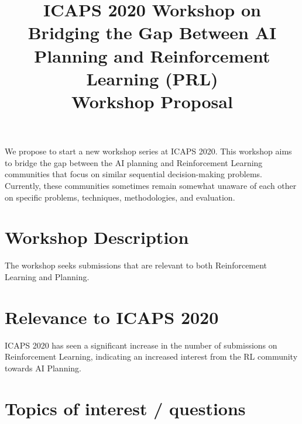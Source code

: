 \documentclass[10pt]{article}
\begin{document}
\title{ICAPS 2020 Workshop on \\ Bridging the Gap Between AI Planning and Reinforcement Learning (PRL)\\ \vspace*{0.7cm} Workshop Proposal
}
\date{}

\author{}

\maketitle


We propose to start a new workshop series at ICAPS 2020. This workshop aims to
bridge the gap between the AI planning and Reinforcement Learning communities
that focus on similar sequential decision-making problems. Currently, these
communities sometimes remain somewhat unaware of each other on specific
problems, techniques, methodologies, and evaluation.

\section*{Workshop Description}

The workshop seeks submissions that are relevant to both Reinforcement Learning
and Planning. 



\section*{Relevance to ICAPS 2020}
ICAPS 2020 has seen a significant increase in the number of submissions on
Reinforcement Learning, indicating an increased interest from the RL community
towards AI Planning.

\section*{Topics of interest / questions}
\end{document}
